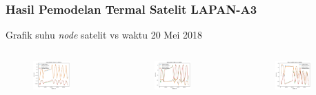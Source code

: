 \documentclass[8pt]{beamer}
\begin{document}
\begin{frame}
  \frametitle{Hasil Pemodelan Termal Satelit LAPAN-A3}
  \center Grafik suhu \textit{node} satelit vs waktu 20 Mei 2018
  \begin{columns}[T]
      \begin{figure}
          \includegraphics[width=0.7\textwidth]{figure/paper_node12_temp_2018-05-20.png}
      \end{figure}
      \begin{figure}
          \includegraphics[width=0.7\textwidth]{figure/paper_node34_temp_2018-05-20.png}
      \end{figure}
      \begin{figure}
          \includegraphics[width=0.7\textwidth]{figure/paper_node56_temp_2018-05-20.png}

\end{figure}
\end{columns}
\end{frame}
\end{document}
